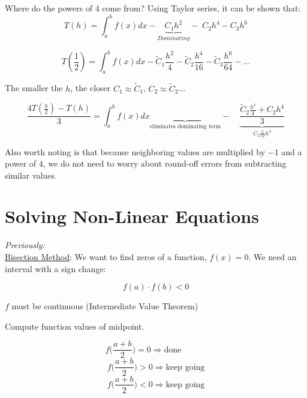 \documentclass[a4paper,12pt]{report}
\begin{document}
	Where do the powers of 4 come from? Using Taylor series, it can be shown that:\\
	$$ T(h)= \int^b_a f(x) dx - \!\!\!\!\! \underbrace{C_1 h^2}_{Dominating} \!\!\!\!-\; C_2 h^4 - C_3 h^6 $$
	
	$$ T(\frac{1}{2}) = \int^b_a f(x) dx - \tilde{C}_1 \frac{h^2}{4} - \tilde{C}_2 \frac{h^4}{16} - \tilde{C}_3 \frac{h^6}{64} - ...$$
	
	\noindent The smaller the $h$, the closer $C_1 \approx \tilde{C}_1$, $C_2 \approx \tilde{C}_2$...
	
	$$ \frac{4T(\frac{h}{2})-T(h)}{3} =  \int^b_a f(x) dx 
	\!\!\!\!\!\!\!\!\!\!\!\! \underbrace{\qquad \qquad}_{\text{eliminates dominating term}} \!\!\!\!\!\!\!\!\!
	 - \quad \underbrace{\frac{\tilde{C}_2 \frac{h^4}{4}+C_2 h^4}{3}}_{C_2 \frac{5}{12}h^4}$$


	Also worth noting is that because neighboring values are multiplied by $-1$ and a power of $4$, we do not need to worry about round-off errors
	 from subtracting similar values.

	
	\chapter{Solving Non-Linear Equations}
	
	\noindent \textit{Previously:}\\
	\underline{Bisection Method}:  We want to find zeros of a function, $f(x) = 0$.	We need an interval with a sign change:
	
	$$ f(a) \cdot f(b) < 0 $$
	
	\medskip
	\noindent $f$ must be continuous (Intermediate Value Theorem)

\begin{multicols}{2}

	Compute function values of midpoint.
	\columnbreak
	
	$$f\Big( \frac{a+b}{2} \Big) = 0 \Rightarrow \text{done}\quad \! \! \qquad$$
	$$ f\Big( \frac{a+b}{2} \Big) > 0 \Rightarrow \text{keep going}$$
	$$ f\Big( \frac{a+b}{2} \Big) < 0 \Rightarrow \text{keep going}$$
\end{multicols}
	
\end{document}
